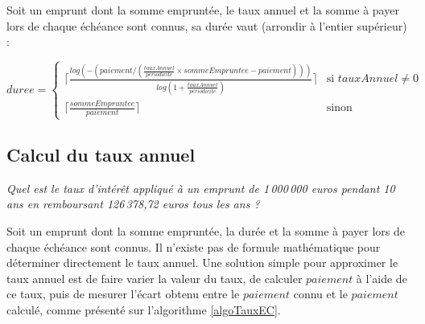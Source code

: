 \documentclass[11pt,a4paper]{scrartcl}
\begin{document}
Soit un emprunt dont la somme empruntée, le taux annuel et la somme à payer lors de chaque échéance sont connus, sa durée vaut (arrondir à l'entier supérieur) :



\begin{equation}
	duree=
	\begin{cases}
		\lceil\frac{log(-(paiement/(\frac{tauxAnnuel}{periodicite}\times sommeEmpruntee-paiement)))}{log(1+\frac{tauxAnnuel}{periodicite})}\rceil& \text{si } tauxAnnuel \neq 0\\
		\lceil\frac{sommeEmpruntee}{paiement}\rceil& \text{sinon}
	\end{cases}
\end{equation} 
	



\subsection{Calcul du taux annuel}
\emph{Quel est le taux d'intérêt appliqué à un emprunt de 1\,000\,000 euros pendant 10 ans en remboursant 126\,378,72 euros tous les ans ?}

Soit un emprunt dont la somme empruntée, la durée et la somme à payer lors de chaque échéance sont connus. Il n'existe pas de formule mathématique pour déterminer directement le taux annuel. Une solution simple pour approximer le taux annuel est de faire varier la valeur du taux, de calculer $paiement$ à l'aide de ce taux, puis de mesurer l'écart obtenu entre le $paiement$ connu et le $paiement$ calculé, comme présenté sur l'algorithme \ref{algoTauxEC}.
\end{document}
